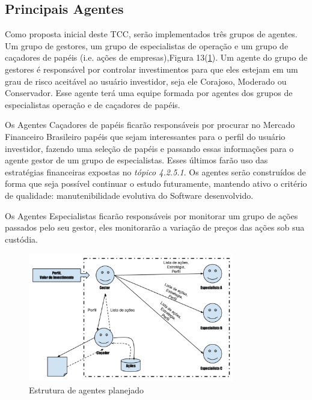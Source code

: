 \subsection{Principais Agentes}

Como proposta inicial deste TCC, serão implementados três grupos de agentes. Um grupo de gestores, um grupo de especialistas de operação e um grupo de caçadores de papéis (i.e. ações de empresas),Figura 13(\ref{f13}). Um agente do grupo de gestores é responsável por controlar investimentos para que eles estejam em um grau de risco aceitável ao usuário investidor, seja ele Corajoso, Moderado ou Conservador. Esse agente terá uma equipe formada por agentes dos grupos de especialistas operação e de caçadores de papéis.

Os Agentes Caçadores de papéis ficarão responsáveis por procurar no Mercado Financeiro Brasileiro papéis que sejam interessantes para o perfil do usuário investidor, fazendo uma seleção de papéis e passando essas informações para o agente gestor de um grupo de especialistas. Esses últimos farão uso das estratégias financeiras expostas no \textit{tópico 4.2.5.1}. Os agentes serão construídos de forma que seja possível continuar o estudo futuramente, mantendo ativo o critério de qualidade: manutenibilidade evolutiva do Software desenvolvido.

Os Agentes Especialistas ficarão responsáveis por monitorar um grupo de ações passados pelo seu gestor, eles monitorarão a variação de preços das ações sob sua custódia.

\begin{figure}[h]
\centering
\label{f13}
\includegraphics[width=0.8\textwidth]{figuras/f13}
\caption{Estrutura de agentes planejado }

\end{figure}

